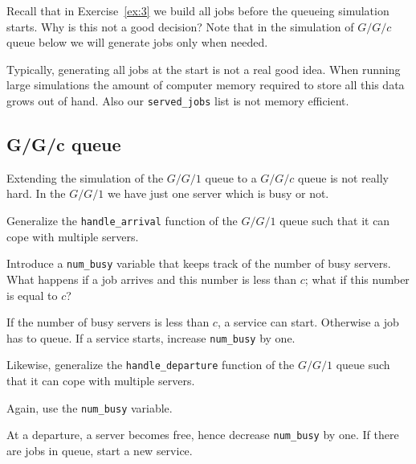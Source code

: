 \documentclass{scrartcl}
\begin{document}
\begin{exercise}
  Recall that in Exercise~\ref{ex:3} we build all jobs before the queueing simulation starts. Why is this not a good decision? Note that in the simulation of $G/G/c$ queue below we will generate jobs only when needed. 
  \begin{solution}
    Typically, generating all jobs at the start is not a real good idea. When running large simulations the amount of computer memory required to store all this data grows out of hand. Also our \texttt{served\_jobs} list is not memory efficient. 
  \end{solution}
\end{exercise}

\subsection{G/G/c queue}

\label{sec:ggc-queue}

Extending the simulation of the $G/G/1$ queue to a $G/G/c$ queue is not really hard. In the $G/G/1$ we have just one server which is busy or not.

\begin{exercise}
  Generalize  the \texttt{handle\_arrival} function of the $G/G/1$ queue such that it can cope with multiple servers.

  \hintsymbol\begin{hint}
  Introduce a \texttt{num\_busy} variable that keeps track of the number of busy servers. What happens if a job arrives and this number is less than $c$; what if this number is equal to $c$?
  \end{hint}
  \begin{solution}
    If the number of busy servers is less than $c$, a service can start. Otherwise a job has to queue. If a service starts, increase \texttt{num\_busy} by one. 
  \end{solution}
\end{exercise}


\begin{exercise}
Likewise,   generalize  the \texttt{handle\_departure} function of the $G/G/1$ queue such that it can cope with multiple servers.
\hintsymbol\begin{hint}
  Again, use the \texttt{num\_busy} variable. 
\end{hint}

\begin{solution}
  At a departure, a server becomes free, hence decrease \texttt{num\_busy} by one. If there are jobs in queue, start a new service.
\end{solution}
\end{exercise}
\end{document}
